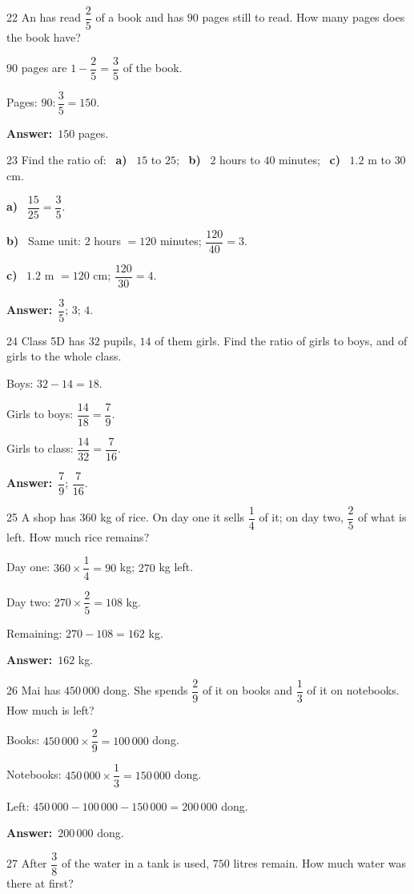 \documentclass[11pt]{article}
\newif\ifsol \solfalse
\providecommand{\AnsWord}{Đáp số}
\newcommand{\dapso}[1]{\par\textbf{\AnsWord:}\ #1}
\newcommand{\probsol}[1]{%
  \begin{lrbox}{\solmeasure}\begin{minipage}{\dimexpr\linewidth-24pt\relax}#1\end{minipage}\end{lrbox}%
  \ifsol
    \begin{solbox}#1\end{solbox}%
  \else
    \setlength{\solht}{\dimexpr\ht\solmeasure+\dp\solmeasure+0.85cm\relax}%
    \ifdim\solht<1.35cm\setlength{\solht}{1.35cm}\fi
    \begin{tcolorbox}[colback=white,colframe=Line,boxrule=0.8pt,arc=5pt,
      left=8pt,right=8pt,top=4pt,bottom=4pt,height=\solht]{\footnotesize\color{Slate}\itshape\WorkWord}\end{tcolorbox}%
  \fi}
\newcommand{\pa}[1]{\textbf{#1)}\ }
\newcommand{\gap}{\vspace{0.3cm}}
\def\WorkWord{Your work:}
\def\AnsWord{Answer}
\begin{document}
\gap
\begin{probbox}{22}{\relax}
An has read $\dfrac25$ of a book and has $90$ pages still to read. How many pages does the book have?
\end{probbox}
\probsol{
$90$ pages are $1-\dfrac25=\dfrac35$ of the book.\par Pages: $90:\dfrac35=150$.
\dapso{$150$ pages.}}
\gap
\begin{probbox}{23}{\relax}
Find the ratio of: \ \pa{a} $15$ to $25$; \ \pa{b} $2$ hours to $40$ minutes; \ \pa{c} $1.2$ m to $30$ cm.
\end{probbox}
\probsol{
\pa{a} $\dfrac{15}{25}=\dfrac35$.\par \pa{b} Same unit: $2$ hours $=120$ minutes; $\dfrac{120}{40}=3$.\par \pa{c} $1.2$ m $=120$ cm; $\dfrac{120}{30}=4$.
\dapso{$\dfrac35$; $3$; $4$.}}
\gap
\begin{probbox}{24}{\relax}
Class 5D has $32$ pupils, $14$ of them girls. Find the ratio of girls to boys, and of girls to the whole class.
\end{probbox}
\probsol{
Boys: $32-14=18$.\par Girls to boys: $\dfrac{14}{18}=\dfrac79$.\par Girls to class: $\dfrac{14}{32}=\dfrac7{16}$.
\dapso{$\dfrac79$; $\dfrac7{16}$.}}
\gap
\begin{probbox}{25}{\relax}
A shop has $360$ kg of rice. On day one it sells $\dfrac14$ of it; on day two, $\dfrac25$ of what is left. How much rice remains?
\end{probbox}
\probsol{
Day one: $360\times\dfrac14=90$ kg; $270$ kg left.\par Day two: $270\times\dfrac25=108$ kg.\par Remaining: $270-108=162$ kg.
\dapso{$162$ kg.}}
\gap
\begin{probbox}{26}{\relax}
Mai has $450\,000$ dong. She spends $\dfrac29$ of it on books and $\dfrac13$ of it on notebooks. How much is left?
\end{probbox}
\probsol{
Books: $450\,000\times\dfrac29=100\,000$ dong.\par Notebooks: $450\,000\times\dfrac13=150\,000$ dong.\par Left: $450\,000-100\,000-150\,000=200\,000$ dong.
\dapso{$200\,000$ dong.}}
\gap
\begin{probbox}{27}{\relax}
After $\dfrac38$ of the water in a tank is used, $750$ litres remain. How much water was there at first?
\end{probbox}
\end{document}
